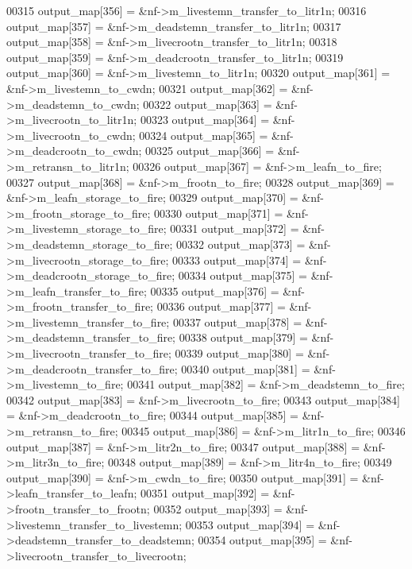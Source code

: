 \begin{DoxyCode}
00315         output\_map[356] = &nf->m\_livestemn\_transfer\_to\_litr1n;
00316         output\_map[357] = &nf->m\_deadstemn\_transfer\_to\_litr1n;
00317         output\_map[358] = &nf->m\_livecrootn\_transfer\_to\_litr1n;
00318         output\_map[359] = &nf->m\_deadcrootn\_transfer\_to\_litr1n;
00319         output\_map[360] = &nf->m\_livestemn\_to\_litr1n;
00320         output\_map[361] = &nf->m\_livestemn\_to\_cwdn;
00321         output\_map[362] = &nf->m\_deadstemn\_to\_cwdn;
00322         output\_map[363] = &nf->m\_livecrootn\_to\_litr1n;
00323         output\_map[364] = &nf->m\_livecrootn\_to\_cwdn;
00324         output\_map[365] = &nf->m\_deadcrootn\_to\_cwdn;
00325         output\_map[366] = &nf->m\_retransn\_to\_litr1n;
00326         output\_map[367] = &nf->m\_leafn\_to\_fire;
00327         output\_map[368] = &nf->m\_frootn\_to\_fire;
00328         output\_map[369] = &nf->m\_leafn\_storage\_to\_fire;
00329         output\_map[370] = &nf->m\_frootn\_storage\_to\_fire;
00330         output\_map[371] = &nf->m\_livestemn\_storage\_to\_fire;
00331         output\_map[372] = &nf->m\_deadstemn\_storage\_to\_fire;
00332         output\_map[373] = &nf->m\_livecrootn\_storage\_to\_fire;
00333         output\_map[374] = &nf->m\_deadcrootn\_storage\_to\_fire;
00334         output\_map[375] = &nf->m\_leafn\_transfer\_to\_fire;
00335         output\_map[376] = &nf->m\_frootn\_transfer\_to\_fire;
00336         output\_map[377] = &nf->m\_livestemn\_transfer\_to\_fire;
00337         output\_map[378] = &nf->m\_deadstemn\_transfer\_to\_fire;
00338         output\_map[379] = &nf->m\_livecrootn\_transfer\_to\_fire;
00339         output\_map[380] = &nf->m\_deadcrootn\_transfer\_to\_fire;
00340         output\_map[381] = &nf->m\_livestemn\_to\_fire;
00341         output\_map[382] = &nf->m\_deadstemn\_to\_fire;
00342         output\_map[383] = &nf->m\_livecrootn\_to\_fire;
00343         output\_map[384] = &nf->m\_deadcrootn\_to\_fire;
00344         output\_map[385] = &nf->m\_retransn\_to\_fire;
00345         output\_map[386] = &nf->m\_litr1n\_to\_fire;
00346         output\_map[387] = &nf->m\_litr2n\_to\_fire;
00347         output\_map[388] = &nf->m\_litr3n\_to\_fire;
00348         output\_map[389] = &nf->m\_litr4n\_to\_fire;
00349         output\_map[390] = &nf->m\_cwdn\_to\_fire;
00350         output\_map[391] = &nf->leafn\_transfer\_to\_leafn;
00351         output\_map[392] = &nf->frootn\_transfer\_to\_frootn;
00352         output\_map[393] = &nf->livestemn\_transfer\_to\_livestemn;
00353         output\_map[394] = &nf->deadstemn\_transfer\_to\_deadstemn;
00354         output\_map[395] = &nf->livecrootn\_transfer\_to\_livecrootn;

\end{DoxyCode}
